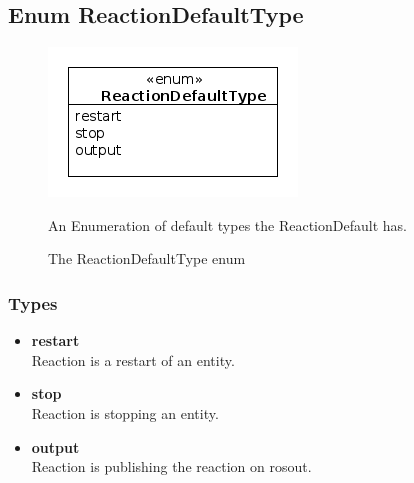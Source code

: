 \newpage
\subsection{Enum ReactionDefaultType}
\begin{figure}[htbp]
	\begin{minipage}[t]{8cm}
		\vspace{0pt}
		\centering
		\includegraphics[scale=0.6]{./diagram_pictures/reactor/ReactionDefaultType.png}
		\caption{The ReactionDefaultType enum}
	\end{minipage}
	\hfill
	\begin{minipage}[t]{8cm}
		\vspace{10pt}
			An Enumeration of default types the ReactionDefault has.
	\end{minipage}
\end{figure}  


\subsubsection{Types}
\begin{itemize}
	\item \textbf{ restart }\\
		Reaction is a restart of an entity.
	\item \textbf{ stop }\\
		Reaction is stopping an entity.
	\item \textbf{ output }\\
		Reaction is publishing the reaction on rosout.
\end{itemize}


\newpage
